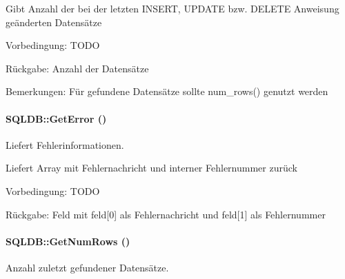 Gibt Anzahl der bei der letzten INSERT, UPDATE bzw. DELETE Anweisung geänderten Datensätze \begin{Desc}
\item[Vorbedingung:]TODO \end{Desc}
\begin{Desc}
\item[R\"{u}ckgabe:]Anzahl der Datensätze \end{Desc}
\begin{Desc}
\item[Bemerkungen:]Für gefundene Datensätze sollte num\_\-rows() genutzt werden \end{Desc}
\hypertarget{classSQLDB_efc9afe11649d6cdae21575717ec3436}{
\paragraph[GetError]{\setlength{\rightskip}{0pt plus 5cm}SQLDB::Get\-Error ()}\hfill}
\label{classSQLDB_efc9afe11649d6cdae21575717ec3436}


Liefert Fehlerinformationen. 

Liefert Array mit Fehlernachricht und interner Fehlernummer zurück \begin{Desc}
\item[Vorbedingung:]TODO \end{Desc}
\begin{Desc}
\item[R\"{u}ckgabe:]Feld mit feld\mbox{[}0\mbox{]} als Fehlernachricht und feld\mbox{[}1\mbox{]} als Fehlernummer \end{Desc}
\hypertarget{classSQLDB_15b181251b309ab55331be29fa33ac9f}{
\paragraph[GetNumRows]{\setlength{\rightskip}{0pt plus 5cm}SQLDB::Get\-Num\-Rows ()}\hfill}
\label{classSQLDB_15b181251b309ab55331be29fa33ac9f}


Anzahl zuletzt gefundener Datensätze. 

